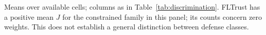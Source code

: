 \begin{table}[!t]
\par\vspace{3pt}\parbox{\linewidth}{\footnotesize Means over available cells; columns as in Table~\ref{tab:discrimination}. FLTrust has a positive mean $J$ for the constrained family in this panel; its counts concern zero weights. This does not establish a general distinction between defense classes.}
\end{table}
